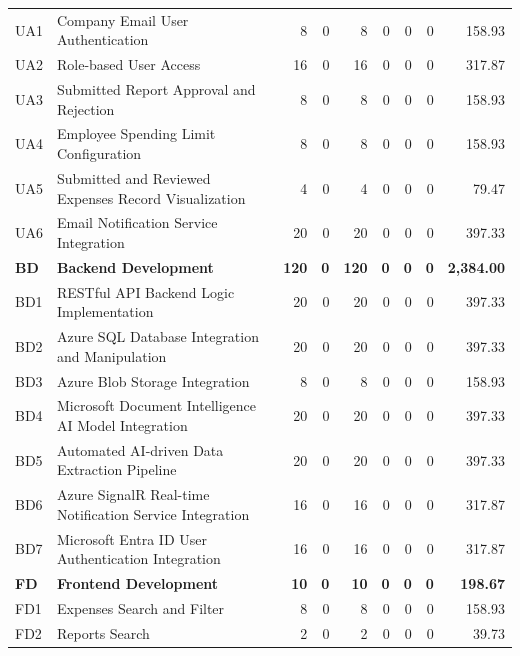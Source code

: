 \begin{longtable}{@{}l p{8.5cm} r r r r r r r@{}}
\rowcolor{gray!05}
UA1 & Company Email User Authentication & 8 & 0 & 8 & 0 & 0 & 0 & 158.93 \\
\rowcolor{gray!05}
UA2 & Role-based User Access & 16 & 0 & 16 & 0 & 0 & 0 & 317.87 \\
\rowcolor{gray!05}
UA3 & Submitted Report Approval and Rejection & 8 & 0 & 8 & 0 & 0 & 0 & 158.93 \\
\rowcolor{gray!05}
UA4 & Employee Spending Limit Configuration & 8 & 0 & 8 & 0 & 0 & 0 & 158.93 \\
\rowcolor{gray!05} 
UA5 & Submitted and Reviewed Expenses Record Visualization & 4 & 0 & 4 & 0 & 0 & 0 & 79.47 \\
\rowcolor{gray!05}
UA6 & Email Notification Service Integration & 20 & 0 & 20 & 0 & 0 & 0 & 397.33 \\
\rowcolor{gray!20}
\textbf{BD} & \textbf{Backend Development} & \textbf{120} & \textbf{0} & \textbf{120} & \textbf{0} & \textbf{0} & \textbf{0} & \textbf{2,384.00} \\
\rowcolor{gray!05}
BD1 & RESTful API Backend Logic Implementation & 20 & 0 & 20 & 0 & 0 & 0 & 397.33 \\
\rowcolor{gray!05}
BD2 & Azure SQL Database Integration and Manipulation & 20 & 0 & 20 & 0 & 0 & 0 & 397.33 \\
\rowcolor{gray!05}
BD3 & Azure Blob Storage Integration & 8 & 0 & 8 & 0 & 0 & 0 & 158.93 \\
\rowcolor{gray!05}
BD4 & Microsoft Document Intelligence AI Model Integration & 20 & 0 & 20 & 0 & 0 & 0 & 397.33 \\
\rowcolor{gray!05}
BD5 & Automated AI-driven Data Extraction Pipeline & 20 & 0 & 20 & 0 & 0 & 0 & 397.33 \\
\rowcolor{gray!05}
BD6 & Azure SignalR Real-time Notification Service Integration & 16 & 0 & 16 & 0 & 0 & 0 & 317.87 \\
\rowcolor{gray!05}
BD7 & Microsoft Entra ID User Authentication Integration & 16 & 0 & 16 & 0 & 0 & 0 & 317.87 \\
\rowcolor{gray!20}
\textbf{FD} & \textbf{Frontend Development} & \textbf{10} & \textbf{0} & \textbf{10} & \textbf{0} & \textbf{0} & \textbf{0} & \textbf{198.67} \\
\rowcolor{gray!05}
FD1 & Expenses Search and Filter & 8 & 0 & 8 & 0 & 0 & 0 & 158.93 \\
\rowcolor{gray!05}
FD2 & Reports Search & 2 & 0 & 2 & 0 & 0 & 0 & 39.73 \\
\end{longtable}
\normalsize
 
